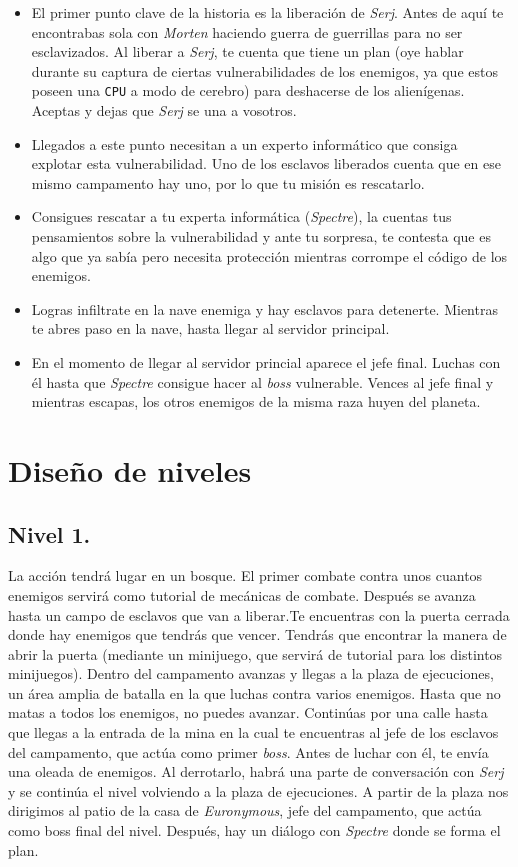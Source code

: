 \documentclass[11pt, twoside]{article}
\begin{document}
\begin{itemize}
\item El primer punto clave de la historia es la liberación de \textit{Serj}. Antes de aquí te encontrabas sola con \textit{Morten} haciendo guerra de guerrillas para no ser esclavizados. Al liberar a \textit{Serj}, te cuenta que tiene un plan (oye hablar durante su captura de ciertas vulnerabilidades de los enemigos, ya que estos poseen una \texttt{CPU} a modo de cerebro) para deshacerse de los alienígenas. Aceptas y dejas que \textit{Serj} se una a vosotros.
\item Llegados a este punto necesitan a un experto informático que consiga explotar esta vulnerabilidad. Uno de los esclavos liberados cuenta que en ese mismo campamento hay uno, por lo que tu misión es rescatarlo. 
\item Consigues rescatar a tu experta informática (\textit{Spectre}), la cuentas tus pensamientos sobre la vulnerabilidad y ante tu sorpresa, te contesta que es algo que ya sabía pero necesita protección mientras corrompe el código de los enemigos. 
\item Logras infiltrate en la nave enemiga y hay esclavos para detenerte. Mientras te abres paso en la nave, hasta llegar al servidor principal. 
\item En el momento de llegar al servidor princial aparece el jefe final. Luchas con él hasta que \textit{Spectre} consigue hacer al \textit{boss} vulnerable. Vences al jefe final y mientras escapas, los otros enemigos de la misma raza huyen del planeta. 
\end{itemize}

\newpage
\pagestyle{insection}
\section{Diseño de niveles}

\subsection{Nivel 1.}
La acción tendrá lugar en un bosque. El primer combate contra unos cuantos enemigos servirá como tutorial de mecánicas de combate. Después se avanza hasta un campo de esclavos que van a liberar.Te encuentras con la puerta cerrada donde hay enemigos que tendrás que vencer. Tendrás que encontrar la manera de abrir la puerta (mediante un minijuego, que servirá de tutorial para los distintos minijuegos). Dentro del campamento avanzas y llegas a la plaza de ejecuciones, un área amplia de batalla en la que luchas contra varios enemigos. Hasta que no matas a todos los enemigos, no puedes avanzar. Continúas por una calle hasta que llegas a la entrada de la mina en la cual te encuentras al jefe de los esclavos del campamento, que actúa como primer \textit{boss}. Antes de luchar con él, te envía una oleada de enemigos. Al derrotarlo, habrá una parte de conversación con \textit{Serj} y se continúa el nivel volviendo a la plaza de ejecuciones. A partir de la plaza nos dirigimos al patio de la casa de \textit{Euronymous}, jefe del campamento, que actúa como boss final del nivel. Después, hay un diálogo con \textit{Spectre} donde se forma el plan. 
\end{document}
